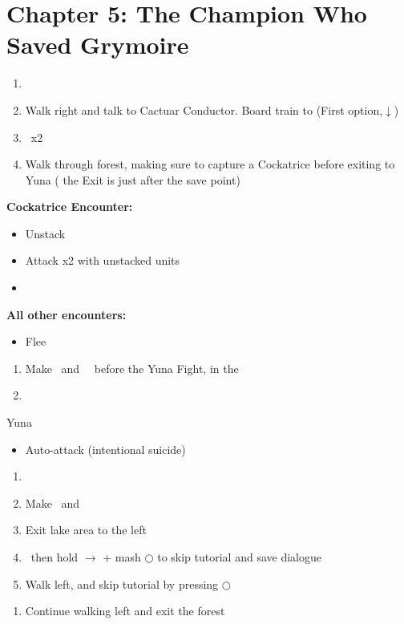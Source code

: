 \chapter{Chapter 5: The Champion Who Saved Grymoire}
\begin{enumerate}
	\item \cs\
	\item Walk right and talk to Cactuar Conductor. Board train to  (First option,$\downarrow$)
	\item \cs\ x2
	\item Walk through forest, making sure to capture a Cockatrice before exiting to Yuna ( the Exit is just after the save point)
\end{enumerate}
\begin{encounters}
\textbf{Cockatrice Encounter:}
	\begin{itemize}
		\item Unstack
		\item Attack x2 with unstacked units
		\item \imprism\
	\end{itemize}
\textbf{All other encounters:}
	\begin{itemize}
		\item Flee
	\end{itemize}
\end{encounters}
\begin{enumerate}[resume]
	\item Make \lann\ and \reynn\ \smallc\ before the Yuna Fight, in the 
	\item \cs\
\end{enumerate}
\begin{battle}[]{Yuna}
	\begin{itemize}
		\item Auto-attack (intentional suicide)
	\end{itemize}
\end{battle}
\begin{enumerate}[resume]
	\item \cs\
	\item Make \lann\ and \reynn\ \bigc\
	\item Exit lake area to the left
	\item \cs\ then hold $\rightarrow$ + mash $\bigcirc$ to skip tutorial and save dialogue
	\item Walk left,  and skip tutorial by pressing $\bigcirc$
\end{enumerate}
\image{Chapter5_Teleport}
\begin{enumerate}[resume]
	\item Continue walking left and exit the forest
\end{enumerate}
